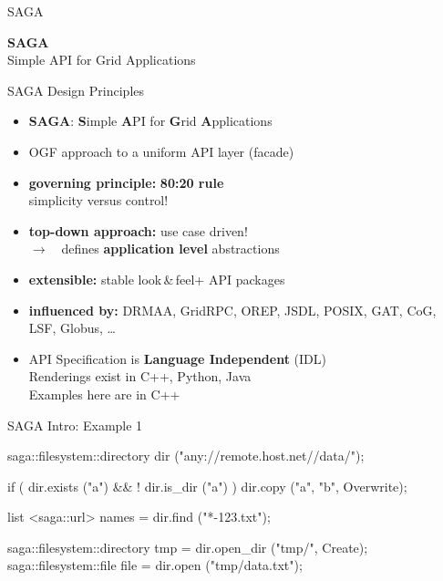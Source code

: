 \documentclass[%
  pdf,
  colorBG,
  slideColor,
  frames,
  ogf
]{prosper}
\newcommand{\B}[1]{\textbf{#1}}
\newcommand{\RA}{$\rightarrow$~~}
\newcommand{\dn}{\vspace*{+1em}}
\newcommand{\lf}{look\,\&\,feel\xspace}
\begin{document}
 
 \begin{slide}{SAGA}
 
  \dn\dn\dn\dn\dn
 
  \begin{center}
   \Huge \B{SAGA}\\[10mm]
   \Large Simple API for Grid Applications
  \end{center}
 
 \end{slide}
 

 \begin{slide}{SAGA Design Principles}

  \begin{itemize}
   \item \B{SAGA}: \B{S}imple \B{A}PI for \B{G}rid \B{A}pplications
   \item OGF approach to a uniform API layer (facade)
   \item \B{governing principle:} \B{80:20 rule}\\
   simplicity versus control!
   \item \B{top-down approach:} use case driven!\\
         \RA defines \B{application level} abstractions
   \item \B{extensible:} stable \lf + API packages
   \item \B{influenced by:} DRMAA, GridRPC, OREP, JSDL,
         POSIX, GAT, CoG, LSF, Globus, \dots
   \item API Specification is \B{Language Independent} (IDL)\\
   Renderings exist in C++, Python, Java\\
   Examples here are in C++
  \end{itemize}

 \end{slide}


 \begin{slide}{SAGA Intro: Example 1}
  
  \begin{mycode}[label=SAGA: File Management]

  saga::filesystem::directory dir ("any://remote.host.net//data/");

  if ( dir.exists ("a") && ! dir.is_dir ("a") )
  {
    dir.copy ("a", "b", Overwrite);
  }

  list <saga::url> names = dir.find ("*-{123}.txt");

  saga::filesystem::directory tmp  = dir.open_dir ("tmp/", Create);
  saga::filesystem::file      file = dir.open     ("tmp/data.txt");

  \end{mycode}
   
 \end{slide}
\end{document}

